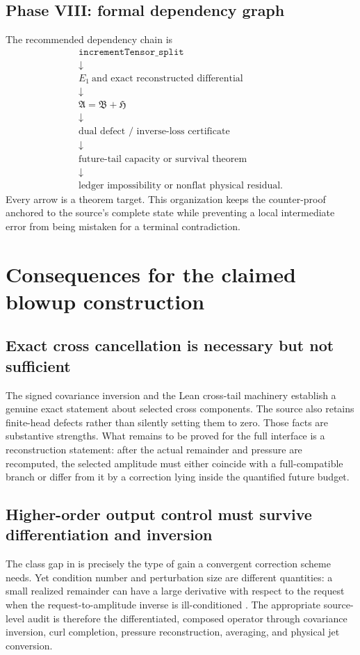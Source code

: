 \documentclass[12pt]{article}
\theoremstyle{plain}
\theoremstyle{definition}
\theoremstyle{remark}
\newcommand{\Comp}{\mathfrak A}
\newcommand{\Red}{\mathfrak B}
\newcommand{\Hidden}{\mathfrak H}
\begin{document}
\subsection{Phase VIII: formal dependency graph}
The recommended dependency chain is
\[
\boxed{
\begin{array}{c}
\texttt{incrementTensor\_split}\\
\downarrow\\
E_1\ \text{and exact reconstructed differential}\\
\downarrow\\
\Comp=\Red+\Hidden\\
\downarrow\\
\text{dual defect / inverse-loss certificate}\\
\downarrow\\
\text{future-tail capacity or survival theorem}\\
\downarrow\\
\text{ledger impossibility or nonflat physical residual}.
\end{array}}
\]
Every arrow is a theorem target. This organization keeps the counter-proof anchored to the source's complete state while preventing a local intermediate error from being mistaken for a terminal contradiction.

\section{Consequences for the claimed blowup construction}\label{sec:consequences}
\subsection{Exact cross cancellation is necessary but not sufficient}
The signed covariance inversion and the Lean cross-tail machinery establish a genuine exact statement about selected cross components. The source also retains finite-head defects rather than silently setting them to zero. Those facts are substantive strengths. What remains to be proved for the full interface is a reconstruction statement: after the actual remainder and pressure are recomputed, the selected amplitude must either coincide with a full-compatible branch or differ from it by a correction lying inside the quantified future budget.

\subsection{Higher-order output control must survive differentiation and inversion}
The class gap in  is precisely the type of gain a convergent correction scheme needs. Yet condition number and perturbation size are different quantities: a small realized remainder can have a large derivative with respect to the request when the request-to-amplitude inverse is ill-conditioned \cite{TrefethenBau1997,StewartSun1990}. The appropriate source-level audit is therefore the differentiated, composed operator through covariance inversion, curl completion, pressure reconstruction, averaging, and physical jet conversion.
\end{document}
